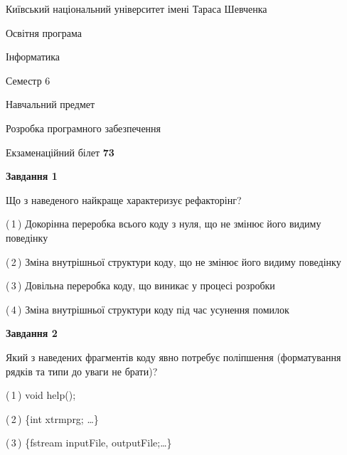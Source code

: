 \documentclass[10pt, ukrainian]{article}
\begin{document}
{{\begin {small}\par
{ \center  Київський національний університет імені Тараса Шевченка \par}
{\parbox {5 cm}{Освітня програма \hfill}{\parbox {7 cm}{Інформатика \hfill}}\parbox {6 cm}{\hfill Семестр 6}}\par
{\parbox {5 cm} {Навчальний предмет \hfill}\parbox {7 cm}{Розробка програмного забезпечення \hfill}\parbox {6cm}{\hfill}\par}\vspace{-7pt} \end{small}}{\center Екзаменаційний білет \No \textbf
{ 73 }\par}}
{
\begin {large}
{\begin {center}\textbf{Завдання 1}\end {center}}\par
Що з наведеного найкраще характеризує рефакторінг?\par
\vspace{2mm}



(\,1\,) Докорінна переробка всього коду з нуля,  що не змінює його видиму поведінку%



(\,2\,) Зміна внутрішньої структури коду, що не змінює його видиму поведінку%



(\,3\,) Довільна переробка коду, що виникає у процесі розробки%



(\,4\,) Зміна внутрішньої структури коду під час усунення помилок%


{\begin {center}\textbf{Завдання 2}\end {center}}\par
Який з наведених фрагментів коду явно потребує поліпшення (форматування рядків та типи до уваги не брати)?\par
\vspace{2mm}



(\,1\,) void help();%



(\,2\,) \{int xtrmprg; …\}%



(\,3\,) \{fstream inputFile, outputFile;…\} %




\end{large}}
\end{document}
